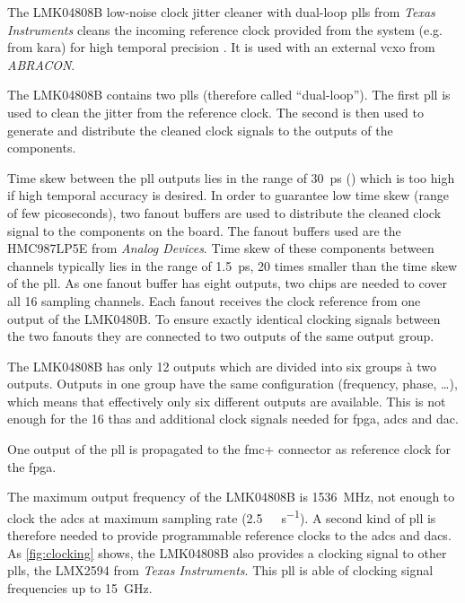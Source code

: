 The LMK04808B low-noise clock jitter cleaner with dual-loop \glspl{pll} from \textit{Texas Instruments} cleans the incoming reference clock provided from the system (e.g. from \gls{kara}) for high temporal precision \cite{caselle2013}.
It is used with an external \gls{vcxo} from \textit{ABRACON}. 

The LMK04808B contains two \glspl{pll} (therefore called ``dual-loop''). 
The first \gls{pll} is used to clean the jitter from the reference clock. 
The second is then used to generate and distribute the cleaned clock signals to the outputs of the components.

Time skew between the \gls{pll} outputs lies in the range of \SI{30}{\pico \second} (\cite{lmk04808b}) which is too high if high temporal accuracy is desired. 
In order to guarantee low time skew (range of few picoseconds), two fanout buffers are used to distribute the cleaned clock signal to the components on the board.
The fanout buffers used are the HMC987LP5E from \textit{Analog Devices}.
Time skew of these components between channels typically lies in the range of \SI{1.5}{\pico \second}, 20 times smaller than the time skew of the \gls{pll}.
As one fanout buffer has eight outputs, two chips are needed to cover all 16 sampling channels. 
Each fanout receives the clock reference from one output of the LMK0480B. 
To ensure exactly identical clocking signals between the two fanouts they are connected to two outputs of the same output group.

The LMK04808B has only 12 outputs which are divided into six groups à two outputs.
Outputs in one group have the same configuration (frequency, phase, \ldots), which means that effectively only six different outputs are available. 
This is not enough for the 16 \glspl{tha} and additional clock signals needed for \gls{fpga}, \glspl{adc} and \gls{dac}. 

One output of the \gls{pll} is propagated to the \gls{fmc}+ connector as reference clock for the \gls{fpga}.

The maximum output frequency of the LMK04808B is \SI{1536}{\mega \hertz}, not enough to clock the \glspl{adc} at maximum sampling rate (\SI{2.5}{\giga \sample \per \second}). 
A second kind of \gls{pll} is therefore needed to provide programmable reference clocks to the \glspl{adc} and \glspl{dac}.
As \autoref{fig:clocking} shows, the LMK04808B also provides a clocking signal to other \glspl{pll}, the LMX2594 from \textit{Texas Instruments}.
This \gls{pll} is able of clocking signal frequencies up to \SI{15}{\giga \hertz}.

